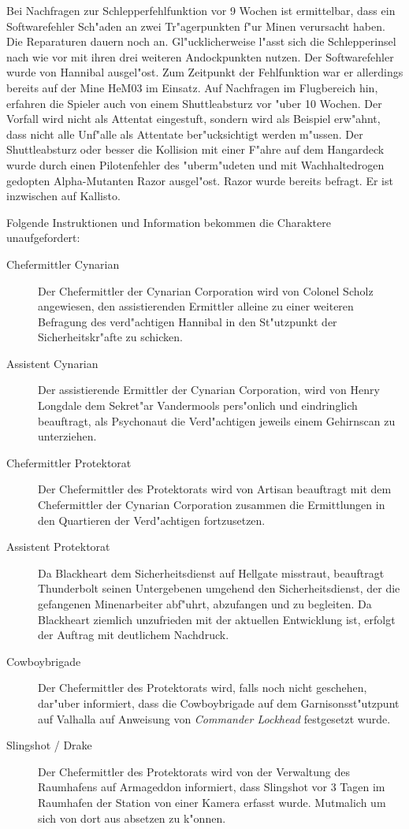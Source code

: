 Bei Nachfragen zur Schlepperfehlfunktion vor 9 Wochen ist ermittelbar, dass ein Softwarefehler Sch"aden an zwei Tr"agerpunkten f"ur Minen verursacht haben. Die Reparaturen dauern noch an. Gl"ucklicherweise l"asst sich die Schlepperinsel nach wie vor mit ihren drei weiteren Andockpunkten nutzen. Der Softwarefehler wurde von Hannibal ausgel"ost. Zum Zeitpunkt der Fehlfunktion war er allerdings bereits auf der Mine HeM03 im Einsatz. Auf Nachfragen im Flugbereich hin, erfahren die Spieler auch von einem Shuttleabsturz vor "uber 10 Wochen. Der Vorfall wird nicht als Attentat eingestuft, sondern wird als Beispiel erw"ahnt, dass nicht alle Unf"alle als Attentate ber"ucksichtigt werden m"ussen. Der Shuttleabsturz oder besser die Kollision mit einer F"ahre auf dem Hangardeck wurde durch einen Pilotenfehler des "uberm"udeten und mit Wachhaltedrogen gedopten Alpha-Mutanten Razor ausgel"ost. Razor wurde bereits befragt. Er ist inzwischen auf Kallisto.

Folgende Instruktionen und Information bekommen die Charaktere unaufgefordert:

\begin{description}
	\item[Chefermittler Cynarian] Der Chefermittler der Cynarian Corporation wird von Colonel Scholz angewiesen, den assistierenden 
		Ermittler alleine zu einer weiteren Befragung des verd"achtigen Hannibal in den St"utzpunkt der Sicherheitskr"afte zu schicken.
	\item[Assistent Cynarian] Der assistierende Ermittler der Cynarian Corporation, wird von Henry Longdale dem Sekret"ar Vandermools 	
		pers"onlich und eindringlich beauftragt, als Psychonaut die Verd"achtigen jeweils einem Gehirnscan zu unterziehen.
	\item[Chefermittler Protektorat] Der Chefermittler des Protektorats wird von Artisan beauftragt mit dem Chefermittler der Cynarian 
		Corporation zusammen die Ermittlungen in den Quartieren der Verd"achtigen fortzusetzen.
	\item[Assistent Protektorat] Da Blackheart dem Sicherheitsdienst auf Hellgate misstraut, beauftragt Thunderbolt seinen Untergebenen 
		umgehend den Sicherheitsdienst, der die gefangenen Minenarbeiter abf"uhrt, abzufangen und zu begleiten. Da Blackheart ziemlich unzufrieden mit der aktuellen Entwicklung ist, erfolgt der Auftrag mit deutlichem Nachdruck.	
	\item[Cowboybrigade] Der Chefermittler des Protektorats wird, falls noch nicht geschehen, dar"uber informiert, dass die Cowboybrigade 	
		auf dem Garnisonsst"utzpunt auf Valhalla auf Anweisung von \emph{Commander Lockhead} festgesetzt wurde.
	\item[Slingshot / Drake] Der Chefermittler des Protektorats wird von der Verwaltung des Raumhafens auf Armageddon informiert, dass 
		Slingshot vor 3 Tagen im Raumhafen der Station von einer Kamera erfasst wurde. Mutma\3lich um sich von dort aus absetzen zu k"onnen.
\end{description}

